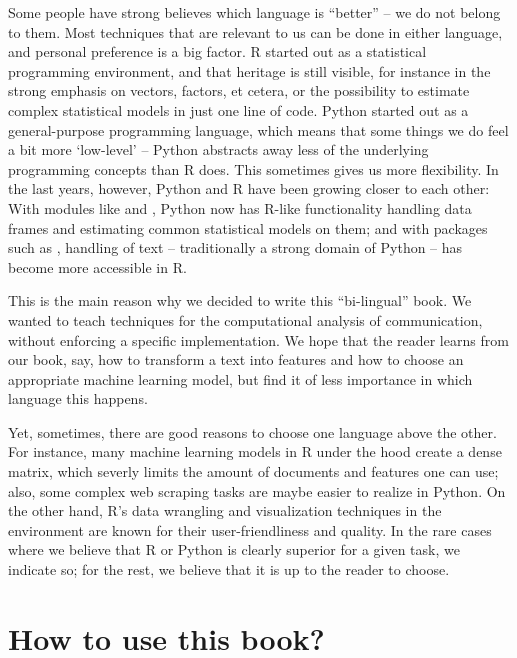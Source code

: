 Some people have strong believes which language is ``better'' -- we do
not belong to them. Most techniques that are relevant to us can be
done in either language, and personal preference is a big factor. R
started out as a statistical programming environment, and that
heritage is still visible, for instance in the strong emphasis on
vectors, factors, et cetera, or the possibility to estimate complex
statistical models in just one line of code. Python started out as a
general-purpose programming language, which means that some things we
do feel a bit more `low-level' -- Python abstracts away less of the
underlying programming concepts than R does. This sometimes gives us
more flexibility. In the last years, however, Python and R have been
growing closer to each other: With modules like  and
, Python now has R-like functionality handling data
frames and estimating common statistical models on them; and with
packages such as , handling of text -- traditionally a
strong domain of Python -- has become more accessible in R.

This is the main reason why we decided to write this ``bi-lingual''
book. We wanted to teach techniques for the computational analysis of
communication, without enforcing a specific implementation. We hope
that the reader learns from our book, say, how to transform a text
into features and how to choose an appropriate machine learning model,
but find it of less importance in which language this happens.

Yet, sometimes, there are good reasons to choose one language above
the other. For instance, many machine learning models in R under the
hood create a dense matrix, which severly limits the amount of
documents and features one can use; also, some complex web scraping
tasks are maybe easier to realize in Python. On the other hand, R's
data wrangling and visualization techniques in the 
environment are known for their user-friendliness and quality.  In the
rare cases where we believe that R or Python is clearly superior for a
given task, we indicate so; for the rest, we believe that it is up to
the reader to choose.


\section{How to use this book?}


